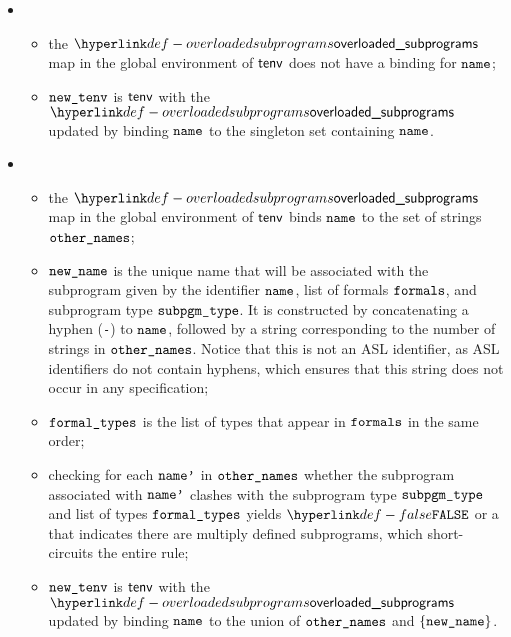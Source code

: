 \ProseParagraph
\OneApplies
\begin{itemize}
  \item {}
  \begin{itemize}
    \item the $\overloadedsubprograms$ map in the global environment of $\tenv$ does not have a binding for $\name$;
    \item $\newtenv$ is $\tenv$ with the $\overloadedsubprograms$ updated by binding $\name$ to the singleton set containing
          $\name$.
  \end{itemize}

  \item {}
  \begin{itemize}
    \item the $\overloadedsubprograms$ map in the global environment of $\tenv$ binds $\name$ to the set of strings $\othernames$;
    \item $\newname$ is the unique name that will be associated with the subprogram given by the identifier $\name$, list of formals $\formals$,
          and subprogram type $\subpgmtype$. It is constructed by concatenating a hyphen (\texttt{-}) to $\name$, followed
          by a string corresponding to the number of strings in $\othernames$.
          Notice that this is not an ASL identifier, as ASL identifiers do not contain hyphens, which ensures that this string
          does not occur in any specification;
    \item $\formaltypes$ is the list of types that appear in $\formals$ in the same order;
    \item checking for each $\namep$ in $\othernames$ whether the subprogram associated with $\namep$ clashes
          with the subprogram type $\subpgmtype$ and list of types $\formaltypes$ yields $\False$
          or a \typingerrorterm{} that indicates there are multiply defined subprograms, which short-circuits the entire rule;
    \item $\newtenv$ is $\tenv$ with the $\overloadedsubprograms$ updated by binding $\name$ to the union of $\othernames$ and
          $\{\newname\}$.
  \end{itemize}
\end{itemize}

\FormallyParagraph
\begin{mathpar}
\end{mathpar}

